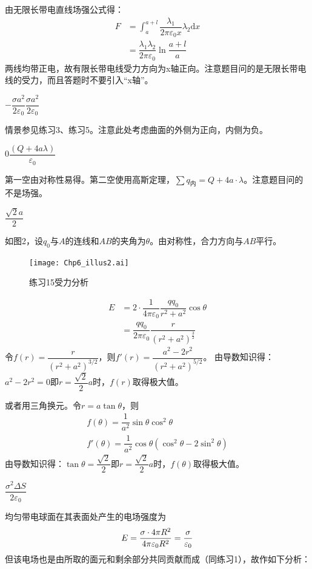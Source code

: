 \documentclass[b5paper,opensource,sourcefont,parskip]{qyxf-book}
\newcommand{\di}[1]{\mathrm{d}#1}
\begin{document}
由无限长带电直线场强公式得：
\begin{align*}
	F&=\int_{a}^{a+l}\dfrac{\lambda_1}{2\pi \varepsilon_0 x}\lambda_2\di{x}\\
	&=\dfrac{\lambda_1\lambda_2}{2\pi \varepsilon_0}\ln\dfrac{a+l}{a}
\end{align*}
两线均带正电，故有限长带电线受力方向为x轴正向。注意题目问的是无限长带电线的受力，而且答题时不要引入“x轴”。

$-\dfrac{\sigma a^2}{2\varepsilon_0}$\quad$\dfrac{\sigma a^2}{2\varepsilon_0}$

\solve
情景参见练习3、练习5。注意此处考虑曲面的外侧为正向，内侧为负。

0\quad $\dfrac{(Q+4a\lambda)}{\varepsilon_0}$

\solve
第一空由对称性易得。第二空使用高斯定理，$\sum q_{\text{内}}=Q+4a\cdot\lambda$。注意题目问的不是场强。

$\dfrac{\sqrt{2}a}{2}$

\solve
如图2，设$q_0$与$A$的连线和$AB$的夹角为$\theta$。由对称性，合力方向与$AB$平行。
\begin{figure}[!htbp]
	\centering
	\texttt{[image: Chp6\_illus2.ai]}
	\caption{练习15\quad 受力分析}
\end{figure}
\begin{align*}
	E&=2\cdot \dfrac{1}{4\pi\varepsilon_0}\dfrac{qq_0}{r^2+a^2}\cos\theta\\
	&=\dfrac{qq_0}{2\pi\varepsilon_0}\dfrac{r}{{(r^2+a^2)}^{\frac{3}{2}}}
\end{align*}
令$f(r)=\dfrac{r}{{(r^2+a^2)}^{3/2}}$，则$f'(r)=\dfrac{a^2-2r^2}{{(r^2+a^2)}^{5/2}}$。
由导数知识得：$a^2-2r^2=0\text{即}r=\dfrac{\sqrt{2}}{2}a$时，$f(r)$取得极大值。

或者用三角换元。令$r=a\tan\theta$，则
\begin{gather*}
	f(\theta)=\dfrac{1}{a^2}\sin\theta\cos^2\theta\\
	f'(\theta)=\dfrac{1}{a^2}\cos\theta(\cos^2\theta-2\sin^2\theta)
\end{gather*}
由导数知识得：$\tan\theta=\dfrac{\sqrt{2}}{2}\text{即}r=\dfrac{\sqrt{2}}{2}a$时，$f(\theta)$取得极大值。

$\dfrac{\sigma^2\Delta S}{2\varepsilon_0}$

\solve
均匀带电球面在其表面处产生的电场强度为
\[
E=\dfrac{\sigma\cdot 4\pi R^2}{4\pi\varepsilon_0R^2}=\dfrac{\sigma}{\varepsilon_0}\\
\]
但该电场也是由所取的面元和剩余部分共同贡献而成（同练习1），故作如下分析：
\end{document}
